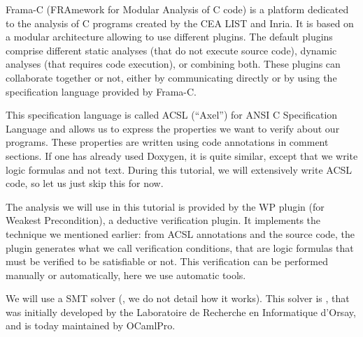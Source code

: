 





Frama-C (FRAmework for Modular Analysis of C code) is a platform
dedicated to the analysis of C programs created by the CEA LIST and
Inria. It is based on a modular architecture allowing to use different
plugins. The default plugins comprise different static analyses (that
do not execute source code), dynamic analyses (that requires code
execution), or combining both. These plugins can collaborate together
or not, either by communicating directly or by using the specification
language provided by Frama-C.





This specification language is called ACSL (``Axel'') for
ANSI C Specification Language and allows us to express the
properties we want to verify about our programs. These properties are
written using code annotations in comment sections. If one has
already used Doxygen, it is quite similar, except that we write logic
formulas and not text. During this tutorial, we will extensively write
ACSL code, so let us just skip this for now.



The analysis we will use in this tutorial is provided by the WP plugin
(for Weakest Precondition), a deductive verification plugin. It implements
the technique we mentioned earlier: from
ACSL annotations and the source code, the plugin generates what we call
verification conditions, that are logic formulas that must be verified to be
satisfiable or not. This verification can be performed manually or
automatically, here we use automatic tools.



We will use a SMT solver
(, we do not detail how it works). This solver is
, that was initially developed
by the Laboratoire de Recherche en Informatique d'Orsay, and is today
maintained by OCamlPro.






